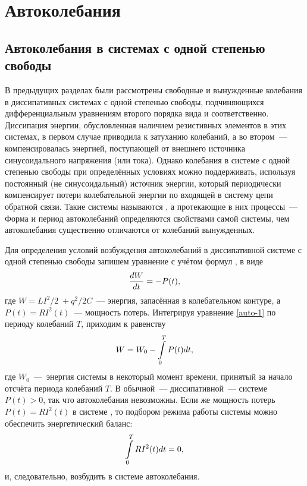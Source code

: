 \section{Автоколебания}

\subsection{Автоколебания в системах с одной степенью свободы}
В предыдущих разделах были рассмотрены свободные и вынужденные колебания в
диссипативных системах с одной степенью свободы, подчиняющихся дифференциальным
уравнениям второго порядка вида  и 
соответственно. Диссипация энергии, обусловленная наличием резистивных элементов
в этих системах, в первом случае приводила к затуханию колебаний, а во
втором~--- компенсировалась энергией, поступающей от
внешнего источника синусоидального напряжения (или тока). Однако колебания в
системе с одной степенью свободы при определённых условиях можно поддерживать,
используя постоянный (не синусоидальный) источник энергии, который периодически
компенсирует потери колебательной энергии по входящей в систему цепи обратной
связи. Такие системы называются , а протекающие в
них процессы~---  Форма и период автоколебаний
определяются свойствами самой системы, чем автоколебания существенно отличаются
от колебаний вынужденных.

Для определения условий возбуждения автоколебаний в диссипативной системе с
одной степенью свободы запишем уравнение  с учётом формул
,  в виде
\begin{equation}
	\eqmark{auto-1}
	\frac{dW}{dt}=-P(t),
\end{equation}
где $W={LI^2}/{2}\;+{q^2}/{2C}$~--- энергия, запасённая в колебательном контуре,
а $P(t)=R{{I}^{2}}(t)$~--- мощность потерь. Интегрируя уравнение \eqref{auto-1}
по периоду колебаний $T$, приходим к равенству
\begin{equation}
	\eqmark{auto-2}
	W=W_0-\int\limits_{0}^{T}P(t)dt,
\end{equation}
где $W_0$~---~энергия системы в некоторый момент времени, принятый за начало
отсчёта периода колебаний $T$. В обычной~--- диссипативной~--- системе $P(t)>0$,
так что автоколебания невозможны. Если же мощность потерь $P(t)=R{{I}^{2}}(t)$ в
системе , то подбором режима работы системы можно
обеспечить энергетический баланс:
\begin{equation}
	\eqmark{auto-3}
	\int\limits_{0}^{T}{R{{I}^{2}}(t)dt}=0,
\end{equation}
и, следовательно, возбудить в системе автоколебания.

